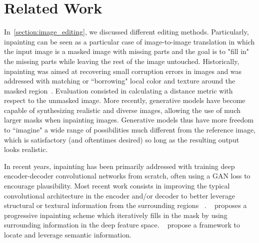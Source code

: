 


\section{Related Work}


In~\ref{section:image_editing}, we discussed different editing methods. Particularly, inpainting can be 
seen as a particular case of image-to-image translation  in which the input image is a masked image with 
missing parts and the goal is to "fill in" the missing parts while leaving the rest of the image 
untouched. Historically, inpainting was aimed at recovering small corruption errors in images and 
was addressed with matching or ``borrowing" local color and texture around the masked
 region~\citep{poisson, patch_based}. Evaluation consisted in calculating a distance
  metric with respect to the unmasked image. More recently, generative models have 
  become capable of synthesizing realistic and diverse images, allowing the use of much
   larger masks when inpainting images. Generative models thus have more freedom 
   to ``imagine" a wide range of possibilities much different from the reference image,
    which is satisfactory (and oftentimes desired) so long as the resulting output looks
     realistic. 

In recent years, inpainting has been primarily addressed with training deep 
encoder-decoder convolutional networks from scratch, often using a 
GAN\citep{goodfellowgans} loss to encourage plausibility. Most recent work consists in 
improving the typical convolutional architecture in the encoder and/or decoder to better
 leverage structural or textural information from the surrounding regions 
~\cite{lama, hong2019deep, yu2020region, hukkelaas2020image, yang2020learning, zhu2021image, liu2018image, ma2022regionwise, zheng2022cm}. 
~\cite{li2020recurrent} proposes a progressive inpainting scheme which iteratively 
 fills in the mask by using surrounding information in the deep feature space.  
~\cite{xiong2019foreground, liao2020guidance} propose a framework to locate and 
 leverage semantic information.


